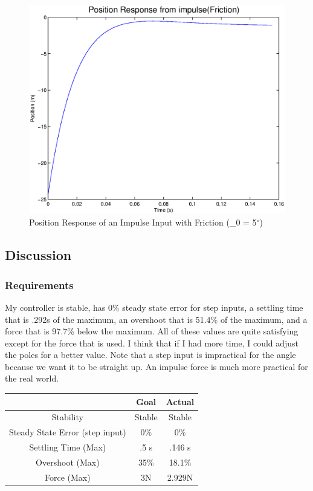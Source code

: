 \documentclass{article}
\begin{document}
\begin{figure}[!htb]
    \centering
    \includegraphics[scale=0.6]{7}
    \caption{Position Response of an Impulse Input with Friction (\theta_0 = 5$^{\circ}$)}
\end{figure} 

\FloatBarrier

\subsection{Discussion}

\subsubsection{Requirements}

My controller is stable, has 0\% steady state error for step inputs, a settling time that is .292s of the maximum, an overshoot that is 51.4\% of the maximum, and a force that is 97.7\% below the maximum. All of these values are quite satisfying except for the force that is used. I think that if I had more time, I could adjust the poles for a better value. Note that a step input is impractical for the angle because we want it to be straight up. An impulse force is much more practical for the real world.

\begin{center}
\begin{tabular}{|c | c | c|} 
\hline
 & Goal & Actual \\ 
\hline
Stability &  Stable & Stable \\ 
\hline
Steady State Error (step input)  & 0\% & 0\% \\ 
\hline
Settling Time (Max) & .5 s & .146 s \\
\hline
Overshoot (Max)& 35\% & 18.1\% \\
\hline
Force (Max) & 3N & 2.929N \\
\hline
\end{tabular}
\end{center}
\end{document}
